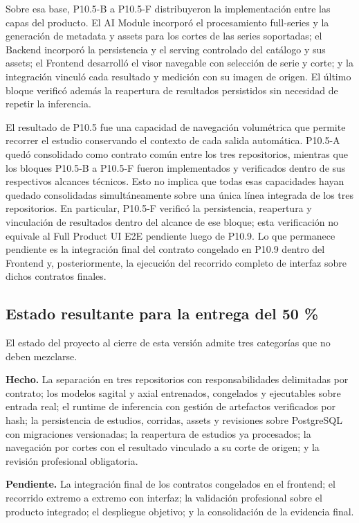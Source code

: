 Sobre esa base, P10.5-B a P10.5-F distribuyeron la implementación entre las capas del producto. El AI Module incorporó el procesamiento full-series y la generación de metadata y assets para los cortes de las series soportadas; el Backend incorporó la persistencia y el serving controlado del catálogo y sus assets; el Frontend desarrolló el visor navegable con selección de serie y corte; y la integración vinculó cada resultado y medición con su imagen de origen. El último bloque verificó además la reapertura de resultados persistidos sin necesidad de repetir la inferencia.

El resultado de P10.5 fue una capacidad de navegación volumétrica que permite recorrer el estudio conservando el contexto de cada salida automática. P10.5-A quedó consolidado como contrato común entre los tres repositorios, mientras que los bloques P10.5-B a P10.5-F fueron implementados y verificados dentro de sus respectivos alcances técnicos. Esto no implica que todas esas capacidades hayan quedado consolidadas simultáneamente sobre una única línea integrada de los tres repositorios. En particular, P10.5-F verificó la persistencia, reapertura y vinculación de resultados dentro del alcance de ese bloque; esta verificación no equivale al Full Product UI E2E pendiente luego de P10.9. Lo que permanece pendiente es la integración final del contrato congelado en P10.9 dentro del Frontend y, posteriormente, la ejecución del recorrido completo de interfaz sobre dichos contratos finales.

\subsection{Estado resultante para la entrega del 50 \%}
\label{anexo:f-estado-entrega-50}

El estado del proyecto al cierre de esta versión admite tres categorías que no deben mezclarse.

\textbf{Hecho.} La separación en tres repositorios con responsabilidades delimitadas por contrato; los modelos sagital y axial entrenados, congelados y ejecutables sobre entrada real; el runtime de inferencia con gestión de artefactos verificados por hash; la persistencia de estudios, corridas, assets y revisiones sobre PostgreSQL con migraciones versionadas; la reapertura de estudios ya procesados; la navegación por cortes con el resultado vinculado a su corte de origen; y la revisión profesional obligatoria.

\textbf{Pendiente.} La integración final de los contratos congelados en el frontend; el recorrido extremo a extremo con interfaz; la validación profesional sobre el producto integrado; el despliegue objetivo; y la consolidación de la evidencia final.

